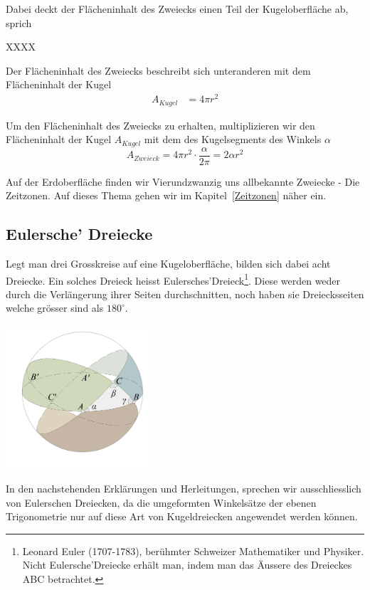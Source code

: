 \begin{refsection}
Dabei deckt der Flächeninhalt des Zweiecks einen Teil der Kugeloberfläche ab, sprich

XXXX

Der Flächeninhalt des Zweiecks beschreibt sich unteranderen mit dem Flächeninhalt der Kugel
\begin{align*}
A_{ Kugel } &= 4 \pi r^{2}
\end{align*}

Um den Flächeninhalt des Zweiecks zu erhalten, multiplizieren wir den Flächeninhalt der Kugel $A_{ Kugel }$ mit dem des Kugelsegments des Winkels $\alpha$ 
\begin{equation}
A_{ Zweieck } = 4 \pi r^{2} \cdot \frac{ \alpha }{ 2 \pi } = 2 \alpha r^{2}
\end{equation}

Auf der Erdoberfläche finden wir Vierundzwanzig uns allbekannte Zweiecke - Die Zeitzonen. Auf dieses Thema gehen wir im Kapitel~\ref{Zeitzonen}  näher ein.


\subsection{Eulersche’ Dreiecke} \label{Euler} 
Legt man drei Grosskreise auf eine Kugeloberfläche, bilden sich dabei acht Dreiecke. 
Ein solches Dreieck heisst Eulersches’Dreieck\footnote{%
Leonard Euler (1707-1783), berühmter Schweizer Mathematiker und Physiker. 
Nicht Eulersche’Dreiecke erhält man, indem man das Äussere des Dreieckes ABC betrachtet.}.
Diese werden weder durch die Verlängerung ihrer Seiten durchschnitten, 
noch haben sie Dreiecksseiten welche grösser sind als $180^{\circ}$.

\begin{center}
        \includegraphics[width=0.4\textwidth]{kugel/_Eulersches.jpg}
\end{center}

In den nachstehenden Erklärungen und Herleitungen, sprechen wir ausschliesslich von Eulerschen Dreiecken, da die umgeformten Winkelsätze der ebenen Trigonometrie nur auf diese Art von Kugeldreiecken angewendet werden können.


\end{refsection}
